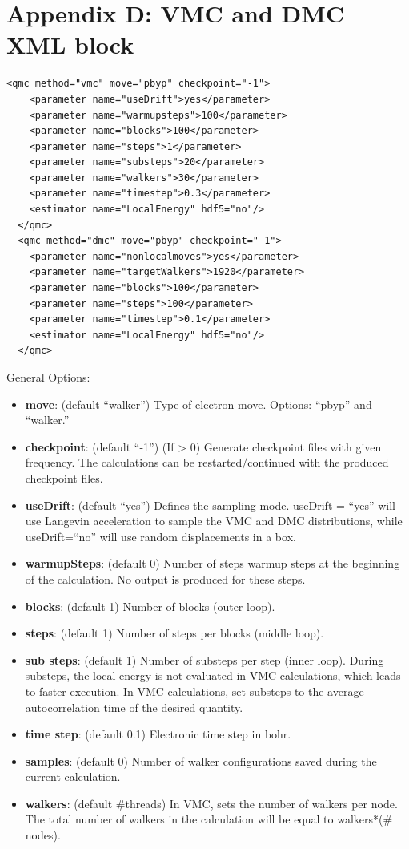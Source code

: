 \newpage
\section{Appendix D: VMC and DMC XML block}

\begin{lstlisting}[style=QMCPXML,caption=``Sample XML blocks for VMC and DMC calculations.",label=lst:lam_xml_vmc_dmc]
  <qmc method="vmc" move="pbyp" checkpoint="-1">
    <parameter name="useDrift">yes</parameter>
    <parameter name="warmupsteps">100</parameter>
    <parameter name="blocks">100</parameter>
    <parameter name="steps">1</parameter>
    <parameter name="substeps">20</parameter>
    <parameter name="walkers">30</parameter>
    <parameter name="timestep">0.3</parameter>
    <estimator name="LocalEnergy" hdf5="no"/>
  </qmc>
  <qmc method="dmc" move="pbyp" checkpoint="-1">
    <parameter name="nonlocalmoves">yes</parameter>
    <parameter name="targetWalkers">1920</parameter>
    <parameter name="blocks">100</parameter>
    <parameter name="steps">100</parameter>
    <parameter name="timestep">0.1</parameter>
    <estimator name="LocalEnergy" hdf5="no"/>
  </qmc>
\end{lstlisting}

General Options:
\begin{itemize}
\item{\textbf{move}: (default ``walker”) Type of electron move. Options: ``pbyp” and ``walker.”}
\item{\textbf{checkpoint}: (default ``-1”) (If > 0) Generate checkpoint files with given frequency.
The calculations can be restarted/continued with the produced checkpoint files.}
\item{\textbf{useDrift}: (default ``yes”) Defines the sampling mode. useDrift = ``yes” will
use Langevin acceleration to sample the VMC and DMC distributions, while
useDrift=``no” will use random displacements in a box.}
\item{\textbf{warmupSteps}: (default 0) Number of steps warmup steps at the beginning of the
calculation. No output is produced for these steps.}
\item{\textbf{blocks}: (default 1) Number of blocks (outer loop).}
\item{\textbf{steps}: (default 1) Number of steps per blocks (middle loop).}
\item{\textbf{sub steps}: (default 1) Number of substeps per step (inner loop). During substeps,
the local energy is not evaluated in VMC calculations, which leads to faster execution.
In VMC calculations, set substeps to the average autocorrelation time of the desired
quantity.}
\item{\textbf{time step}: (default 0.1) Electronic time step in bohr.}
\item{\textbf{samples}: (default 0) Number of walker configurations saved during the current 
calculation.}
\item{\textbf{walkers}: (default \#threads) In VMC, sets the number of walkers per node. The total
number of walkers in the calculation will be equal to walkers*(\# nodes).}
\end{itemize}

